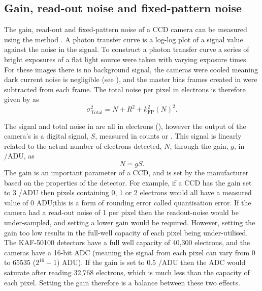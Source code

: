 \subsection{Gain, read-out noise and fixed-pattern noise}
\label{sec:ptc}
\begin{colsection}

The gain, read-out and fixed-pattern noise of a CCD camera can be measured using the  method \citep{CCDs, PTC}. A photon transfer curve is a log-log plot of a signal value against the noise in the signal. To construct a photon transfer curve a series of bright exposures of a flat light source were taken with varying exposure times. For these images there is no background signal, the cameras were cooled meaning dark current noise is negligible (see ), and the master bias frames created in  were subtracted from each frame. The total noise per pixel in electrons is therefore given by  as
%
\begin{equation}
    \sigma_\text{Total}^2 = N + R^2 + k_\text{FP}^2{(N)}^2.
    \label{eq:noise_2}
\end{equation}

The signal and total noise in  are all in electrons (\elec), however the output of the camera's  is a digital signal, $S$, measured in counts or . This signal is linearly related to the actual number of electrons detected, $N$, through the gain, $g$, in \elec/ADU, as
%
\begin{equation}
    N = g S.
    \label{eq:gain}
\end{equation}
%
The gain is an important parameter of a CCD, and is set by the manufacturer based on the properties of the detector. For example, if a CCD has the gain set to 3 \elec/ADU then pixels containing 0, 1 or 2 electrons would all have a measured value of 0 ADU;\@ this is a form of rounding error called quantisation error. If the camera had a read-out noise of 1 \elec{} per pixel then the readout-noise would be under-sampled, and setting a lower gain would be required. However, setting the gain too low results in the full-well capacity of each pixel being under-utilised. The KAF-50100 detectors have a full well capacity of 40,300 electrons, and the cameras have a 16-bit ADC (meaning the signal from each pixel can vary from 0 to 65535 ($2^{16}-1$) ADU). If the gain is set to $0.5$ \elec/ADU then the ADC would saturate after reading 32,768 electrons, which is much less than the capacity of each pixel. Setting the gain therefore is a balance between these two effects.


\end{colsection}
